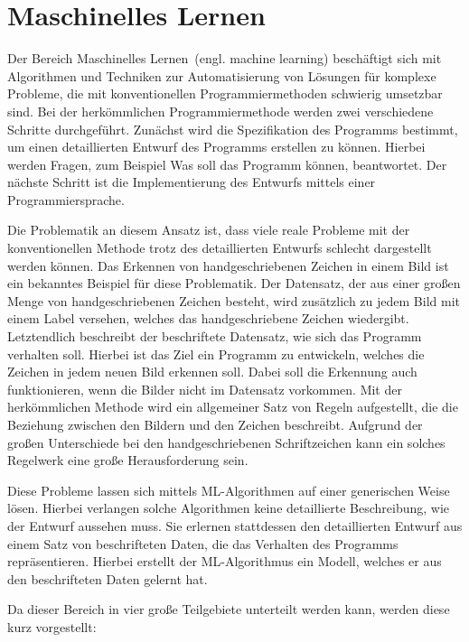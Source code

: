 \chapter{Maschinelles Lernen}
\label{sec:machine_learning}

Der Bereich \glqq Maschinelles Lernen\grqq~(engl. machine learning) beschäftigt sich mit Algorithmen und Techniken zur Automatisierung von Lösungen für komplexe Probleme, die mit konventionellen Programmiermethoden schwierig umsetzbar sind. Bei der herkömmlichen Programmiermethode werden zwei verschiedene Schritte durchgeführt. Zunächst wird die Spezifikation des Programms bestimmt, um einen detaillierten Entwurf des Programms erstellen zu können. Hierbei werden Fragen, zum Beispiel \glqq Was soll das Programm können\grqq, beantwortet. Der nächste Schritt ist die Implementierung des Entwurfs mittels einer Programmiersprache\cite{IntroML}.

Die Problematik an diesem Ansatz ist, dass viele reale Probleme mit der konventionellen Methode trotz des detaillierten Entwurfs schlecht dargestellt werden können. Das Erkennen von handgeschriebenen Zeichen in einem Bild ist ein bekanntes Beispiel für diese Problematik. Der Datensatz, der aus einer großen Menge von handgeschriebenen Zeichen besteht, wird zusätzlich zu jedem Bild mit einem Label versehen, welches das handgeschriebene Zeichen wiedergibt. Letztendlich beschreibt der beschriftete Datensatz, wie sich das Programm verhalten soll. Hierbei ist das Ziel ein Programm zu entwickeln, welches die Zeichen in jedem neuen Bild erkennen soll. Dabei soll die Erkennung auch funktionieren, wenn die Bilder nicht im Datensatz vorkommen. Mit der herkömmlichen Methode wird ein allgemeiner Satz von Regeln aufgestellt, die die Beziehung zwischen den Bildern und den Zeichen beschreibt. Aufgrund der großen Unterschiede bei den handgeschriebenen Schriftzeichen kann ein solches Regelwerk eine große Herausforderung sein\cite{IntroML}.

Diese Probleme lassen sich mittels ML-Algorithmen auf einer generischen Weise lösen. Hierbei verlangen solche Algorithmen keine detaillierte Beschreibung, wie der Entwurf aussehen muss. Sie erlernen stattdessen den detaillierten Entwurf aus einem Satz von beschrifteten Daten, die das Verhalten des Programms repräsentieren. Hierbei erstellt der ML-Algorithmus ein Modell, welches er aus den beschrifteten Daten gelernt hat\cite{IntroML}.
\newpage

Da dieser Bereich in vier große Teilgebiete unterteilt werden kann, werden diese kurz vorgestellt\cite{francois}:

